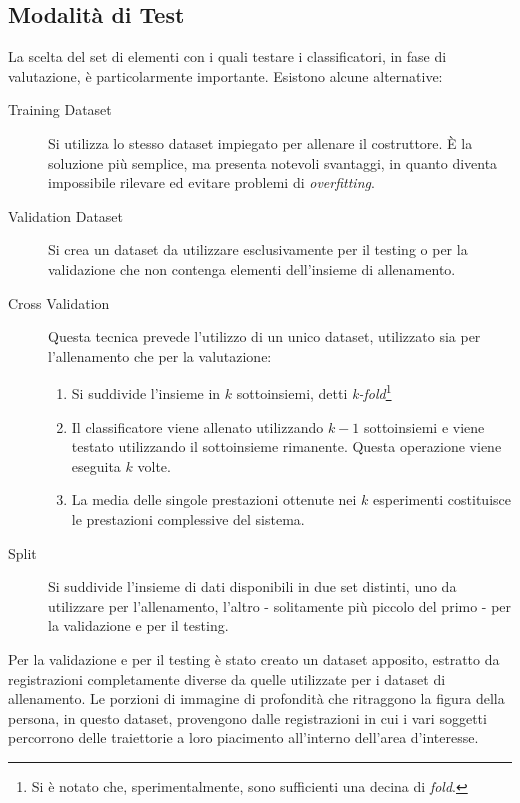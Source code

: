         \subsection{Modalità di Test} %
        \label{sub:dataset_di_validazione}
            La scelta del set di elementi con i quali testare i classificatori, in fase di valutazione, è particolarmente importante. Esistono alcune alternative:
            \begin{description}
                \item [Training Dataset] Si utilizza lo stesso dataset impiegato per allenare il costruttore. È la soluzione più semplice, ma presenta notevoli svantaggi, in quanto diventa impossibile rilevare ed evitare problemi di \emph{overfitting}.

                \item [Validation Dataset] Si crea un dataset da utilizzare esclusivamente per il testing o per la validazione che non contenga elementi dell'insieme di allenamento.

                \item [Cross Validation] Questa tecnica prevede l'utilizzo di un unico dataset, utilizzato sia per l'allenamento che per la valutazione:
                \begin{enumerate}
                    \item Si suddivide l'insieme in $k$ sottoinsiemi, detti \emph{k-fold}\footnote{Si è notato che, sperimentalmente, sono sufficienti una decina di \emph{fold}.}
                    \item Il classificatore viene allenato utilizzando $k-1$ sottoinsiemi e viene testato utilizzando il sottoinsieme rimanente. Questa operazione viene eseguita $k$ volte.
                    \item La media delle singole prestazioni ottenute nei $k$ esperimenti costituisce le prestazioni complessive del sistema.
                \end{enumerate}

                \item [Split] Si suddivide l'insieme di dati disponibili in due set distinti, uno da utilizzare per l'allenamento, l'altro - solitamente più piccolo del primo - per la validazione e per il testing.
            \end{description}

            Per la validazione e per il testing è stato creato un dataset apposito, estratto da registrazioni completamente diverse da quelle utilizzate per i dataset di allenamento.
            Le porzioni di immagine di profondità che ritraggono la figura della persona, in questo dataset, provengono dalle registrazioni in cui i vari soggetti percorrono delle traiettorie a loro piacimento all'interno dell'area d'interesse.

